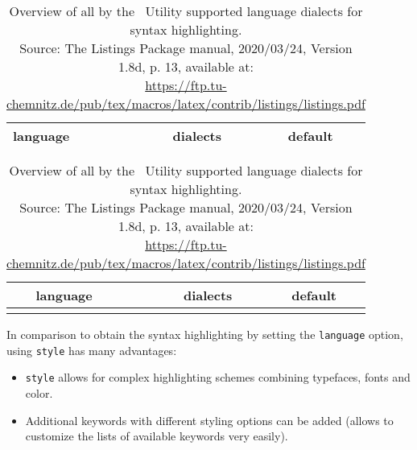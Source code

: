 		
		\newpage
		\def\arrvline{\hspace{-0.425cm}\kern\arraycolsep\vline\kern-\arraycolsep}
		
		\begin{table}[h!]
			\begin{minipage}[t]{0.5\linewidth}
				\begin{longtable}[c]{lcc}
					\rowcolor{white}
					\textbf{language} & \textbf{dialects} & \textbf{default}\\
					\midrule
					\endfirsthead
					
				\end{longtable}
			\end{minipage}
			\begin{minipage}[t]{0.5\linewidth}
				\begin{longtable}[c]{m{0.5mm}lcc}
					\rowcolor{white}
					& \textbf{language} & \textbf{dialects} & \textbf{default}\\
					\midrule
					\endfirsthead
					\rowcolor{tableRowHighlightColor}
					
				\end{longtable}
			\end{minipage}
			\vspace{-0.5cm}
			\caption{%
				Overview of all by the \productName~Utility supported language dialects for syntax highlighting.\\ 
				Source: The Listings Package manual, 2020/03/24, Version 1.8d, p. 13, available at: \\ \href{https://ftp.tu-chemnitz.de/pub/tex/macros/latex/contrib/listings/listings.pdf}{https://ftp.tu-chemnitz.de/pub/tex/macros/latex/contrib/listings/listings.pdf}%
			}
			\label{tab:bf:listing:syntax-highlighting:supported-dialects}
		\end{table}
		In comparison to obtain the syntax highlighting by setting the \lstinline$language$ option, using \lstinline$style$ has many advantages:
		\begin{itemize}
			\setlength\itemsep{-0.25em}
			\item \lstinline$style$ allows for complex highlighting schemes combining typefaces, fonts and color.
			\item Additional keywords with different styling options can be added (allows to customize the lists of available keywords very easily).
		\end{itemize}
